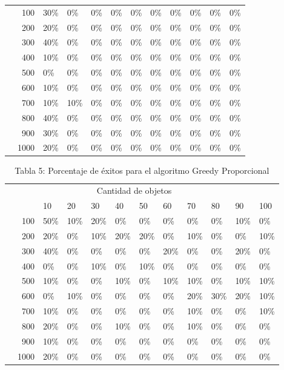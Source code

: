 \documentclass{article}
\begin{document}
\begin{center}
\begin{table}[ht]
\begin{tabularx}{0.8\textwidth}{Xr|XXXXXXXXXX}
\parbox[t]{2mm}{}&100&30\%&0\%&0\%&0\%&0\%&0\%&0\%&0\%&0\%&0\%\\
&200&20\%&0\%&0\%&0\%&0\%&0\%&0\%&0\%&0\%&0\%\\
&300&40\%&0\%&0\%&0\%&0\%&0\%&0\%&0\%&0\%&0\%\\
&400&10\%&0\%&0\%&0\%&0\%&0\%&0\%&0\%&0\%&0\%\\
&500&0\%&0\%&0\%&0\%&0\%&0\%&0\%&0\%&0\%&0\%\\
&600&10\%&0\%&0\%&0\%&0\%&0\%&0\%&0\%&0\%&0\%\\
&700&10\%&10\%&0\%&0\%&0\%&0\%&0\%&0\%&0\%&0\%\\
&800&40\%&0\%&0\%&0\%&0\%&0\%&0\%&0\%&0\%&0\%\\
&900&30\%&0\%&0\%&0\%&0\%&0\%&0\%&0\%&0\%&0\%\\
&1000&20\%&0\%&0\%&0\%&0\%&0\%&0\%&0\%&0\%&0\%\\
\end{tabularx}
\end{table}
\begin{table}[ht]
\centering
\caption*{Tabla 5: Porcentaje de éxitos para el algoritmo Greedy Proporcional}
\label{5}
\begin{tabularx}{0.8\textwidth}{Xr|XXXXXXXXXX}
&\multicolumn{10}{c}{Cantidad de objetos} \\
&&10&20&30&40&50&60&70&80&90&100\\\hline
\parbox[t]{2mm}{}&100&50\%&10\%&20\%&0\%&0\%&0\%&0\%&0\%&10\%&0\%\\
&200&20\%&0\%&10\%&20\%&20\%&0\%&10\%&0\%&0\%&10\%\\
&300&40\%&0\%&0\%&0\%&0\%&20\%&0\%&0\%&20\%&0\%\\
&400&0\%&0\%&10\%&0\%&10\%&0\%&0\%&0\%&0\%&0\%\\
&500&10\%&0\%&0\%&10\%&0\%&10\%&10\%&0\%&10\%&10\%\\
&600&0\%&10\%&0\%&0\%&0\%&0\%&20\%&30\%&20\%&10\%\\
&700&10\%&0\%&0\%&0\%&0\%&0\%&10\%&0\%&0\%&10\%\\
&800&20\%&0\%&0\%&10\%&0\%&0\%&10\%&0\%&0\%&0\%\\
&900&10\%&0\%&0\%&0\%&0\%&0\%&0\%&0\%&0\%&0\%\\
&1000&20\%&0\%&0\%&0\%&0\%&0\%&0\%&0\%&0\%&0\%\\
\end{tabularx}
\end{table}
\end{center}
\end{document}
